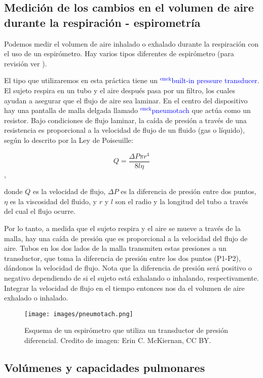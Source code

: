 \documentclass[12pt]{article}
\newcommand{\emck}[1]{\textcolor{blue}{$^{\textrm{emck}}${#1}}}
\begin{document}
\subsection*{Medición de los cambios en el volumen de aire durante la respiración - espirometría}

Podemos medir el volumen de aire inhalado o exhalado durante la
respiración con el uso de un espirómetro. Hay varios tipos diferentes
de espirómetro (para revisión ver \cite{schlegelmilch2011pulmonary}).

El tipo que utilizaremos en esta práctica tiene un \emck{built-in
  pressure transducer}. El sujeto respira en un tubo y el aire después
pasa por un filtro, los cuales ayudan a asegurar que el flujo de aire
sea laminar. En el centro del dispositivo hay una pantalla de malla
delgada llamado \emck{pneumotach} que actúa como un resistor. Bajo
condiciones de flujo laminar, la caída de presión a través de una
resistencia es proporcional a la velocidad de flujo de un fluido (gas
o líquido), según lo descrito por la Ley de Poiseuille:

\begin{equation}
Q=\frac{\Delta P \pi r^{4}}{8 l \eta}
\label{eq:presion}
\end{equation},

donde $Q$ es la velocidad de flujo, $\Delta P$ es la diferencia de
presión entre dos puntos, $\eta$ es la viscosidad del fluido, y $r$ y
$l$ son el radio y la longitud del tubo a través del cual el flujo
ocurre.

Por lo tanto, a medida que el sujeto respira y el aire se mueve a
través de la malla, hay una caída de presión que es proporcional a la
velocidad del flujo de aire. Tubos en los dos lados de la malla
transmiten estas presiones a un transductor, que toma la diferencia de
presión entre los dos puntos (P1-P2), dándonos la velocidad de
flujo. Nota que la diferencia de presión será positivo o negativo
dependiendo de si el sujeto está exhalando o inhalando,
respectivamente. Integrar la velocidad de flujo en el tiempo entonces
nos da el volumen de aire exhalado o inhalado.

\begin{figure}[h!]
\centering
\texttt{[image: images/pneumotach.png]}
\caption{Esquema de un espirómetro que utiliza un transductor de
  presión diferencial. Credito de imagen: Erin C. McKiernan, CC BY.}
\label{fig:pneumotach}
\end{figure}

\subsection*{Volúmenes y capacidades pulmonares}
\end{document}
